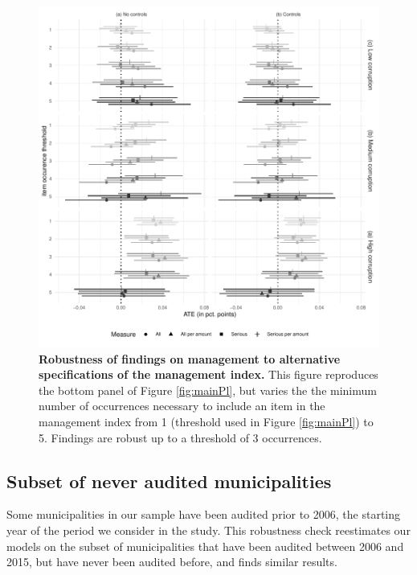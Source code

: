 \documentclass[12pt,a4paper]{article}
\theoremstyle{definition}
\begin{document}
{\begin{figure}[H]
    \centering
    \includegraphics{figures/mgmtRobust.pdf}
    \caption{{\bf Robustness of findings on management to alternative specifications of the management index.} This figure reproduces the bottom panel of Figure \ref{fig:mainPl}, but varies the the minimum number of occurrences necessary to include an item in the management index from 1 (threshold used in Figure \ref{fig:mainPl}) to 5. Findings are robust up to a threshold of 3 occurrences.}
    \label{fig:managementRobustness}
\end{figure}

\subsection{Subset of never audited municipalities}
\label{app:neverAuditedRobustness}

Some municipalities in our sample have been audited prior to 2006, the starting year of the period we consider in the study. This robustness check reestimates our models on the subset of municipalities that have been audited between 2006 and 2015, but have never been audited before, and finds similar results.

}
\end{document}
